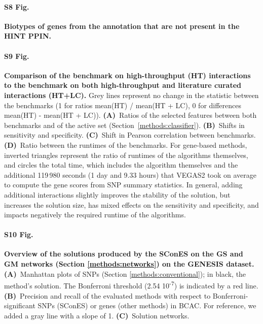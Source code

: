 \documentclass[10pt,letterpaper]{article}
\begin{document}
\paragraph*{S8 Fig.}
\label{sfig:biotypes_excluded}
{\bf Biotypes of genes from the annotation that are not present in the HINT PPIN.}
  
\paragraph*{S9 Fig.}
\label{sfig:lc_ht_comparison}
{\bf Comparison of the benchmark on high-throughput (HT) interactions to the benchmark on both high-throughput and literature curated interactions (HT+LC). } Grey lines represent no change in the statistic between the benchmarks (1 for ratios mean(HT) / mean(HT + LC), 0 for differences mean(HT) - mean(HT + LC)). \textbf{(A)}~Ratios of the selected features between both benchmarks and of the active set (Section~\ref{methods:classifier}). \textbf{(B)}~Shifts in sensitivity and specificity. \textbf{(C)}~Shift in Pearson correlation between benchmarks. \textbf{(D)}~Ratio between the runtimes of the benchmarks. For gene-based methods, inverted triangles represent the ratio of runtimes of the algorithms themselves, and circles the total time, which includes the algorithm themselves and the additional 119\,980 seconds (1 day and 9.33 hours) that VEGAS2 took on average to compute the gene scores from SNP summary statistics. In general, adding additional interactions slightly improves the stability of the solution, but increases the solution size, has mixed effects on the sensitivity and specificity, and impacts negatively the required runtime of the algorithms.
  
\paragraph*{S10 Fig.}
\label{sfig:scones_gsm}
{\bf Overview of the solutions produced by the SConES on the GS and GM networks (Section \ref{methods:networks}) on the GENESIS dataset.} \textbf{(A)}~Manhattan plots of SNPs (Section \ref{methods:conventional}); in black, the method’s solution. The Bonferroni threshold (2.54 \texttimes{} 10\textsuperscript{-7}) is indicated by a red line. \textbf{(B)}~Precision and recall of the evaluated methods with respect to Bonferroni-significant SNPs (SConES) or genes (other methods) in BCAC. For reference, we added a gray line with a slope of 1. \textbf{(C)}~Solution networks.
\end{document}
